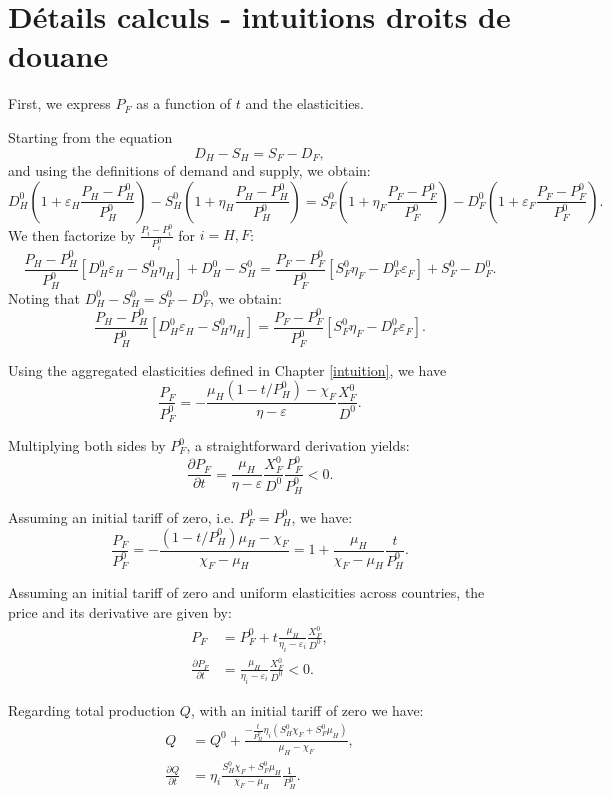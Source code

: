 \section{Détails calculs - intuitions droits de douane}\label{appendix:intuitions_tariff}

First, we express $P_F$ as a function of $t$ and the elasticities.

Starting from the equation
$$
    D_H - S_H = S_F - D_F,
$$
and using the definitions of demand and supply, we obtain:
$$
    D_H^0\left(1+\varepsilon_H \frac{P_H - P_H^0}{P_H^0}\right) - S_H^0\left(1+\eta_H \frac{P_H - P_H^0}{P_H^0}\right) = S_F^0 \left(1+\eta_F \frac{P_F - P_F^0}{P_F^0}\right) - D_F^0\left(1+\varepsilon_F \frac{P_F - P_F^0}{P_F^0}\right).
$$
We then factorize by $\frac{P_i-P_i^0}{P_i^0}$ for $i = H,F$:
$$
    \frac{P_H - P_H^0}{P_H^0} [D_H^0 \varepsilon_H - S_H^0 \eta_H] + D_H^0 - S_H^0 = \frac{P_F - P_F^0}{P_F^0} [S_F^0 \eta_F - D_F^0 \varepsilon_F] + S_F^0 - D_F^0.
$$
Noting that $D_H^0 - S_H^0 = S_F^0 - D_F^0$, we obtain:
$$
    \frac{P_H - P_H^0}{P_H^0} [D_H^0 \varepsilon_H - S_H^0 \eta_H] = \frac{P_F - P_F^0}{P_F^0} [S_F^0 \eta_F - D_F^0 \varepsilon_F].
$$

Using the aggregated elasticities defined in Chapter \ref{intuition}, we have
$$
    \frac{P_F}{P_F^0}= -\frac{\mu_H (1 - t/P_H^0) - \chi_F}{\eta-\varepsilon}\frac{X_F^0}{D^0}.
$$

Multiplying both sides by $P_F^0$, a straightforward derivation yields:
$$
    \frac{\partial P_F}{\partial t} = \frac{\mu_H}{\eta - \varepsilon} \frac{X_F^0}{D^0} \frac{P_F^0}{P_H^0} < 0.
$$

Assuming an initial tariff of zero, i.e. $P_F^0 = P_H^0$, we have:
$$
    \frac{P_F}{P_F^0} = - \frac{(1 - t/P_H^0)\mu_H - \chi_F}{\chi_F - \mu_H} = 1+\frac{\mu_H}{\chi_F - \mu_H}\frac{t}{P_H^0}.
$$

Assuming an initial tariff of zero and uniform elasticities across countries, the price and its derivative are given by:
\begin{align*}
    P_F                             & = P_F^0 + t \frac{\mu_H}{\eta_i - \varepsilon_i} \frac{X_F^0}{D^0}, \\
    \frac{\partial P_F}{\partial t} & = \frac{\mu_H}{\eta_i - \varepsilon_i} \frac{X_F^0}{D^0} < 0.
\end{align*}

Regarding total production $Q$, with an initial tariff of zero we have:
\begin{align*}
    Q                             & = Q^0 + \frac{- \frac{t}{P_H^0}\eta_i(S_H^0 \chi_F + S_F^0 \mu_H)}{\mu_H - \chi_F}, \\
    \frac{\partial Q}{\partial t} & = \eta_i \frac{S_H^0 \chi_F + S_F^0 \mu_H}{\chi_F - \mu_H}\frac{1}{P_H^0}.
\end{align*}

